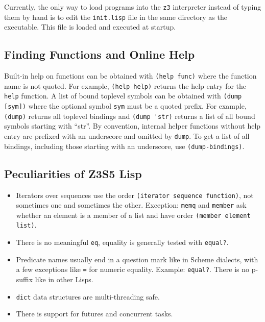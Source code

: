 \documentclass[
]{article}
\newcommand{\passthrough}[1]{#1}
\begin{document}
Currently, the only way to load programs into the
\passthrough{\lstinline!z3!} interpreter instead of typing them by hand
is to edit the \passthrough{\lstinline!init.lisp!} file in the same
directory as the executable. This file is loaded and executed at
startup.

\hypertarget{finding-functions-and-online-help}{%
\subsection{Finding Functions and Online
Help}\label{finding-functions-and-online-help}}

Built-in help on functions can be obtained with
\passthrough{\lstinline!(help func)!} where the function name is not
quoted. For example, \passthrough{\lstinline!(help help)!} returns the
help entry for the \passthrough{\lstinline!help!} function. A list of
bound toplevel symbols can be obtained with
\passthrough{\lstinline!(dump [sym])!} where the optional symbol
\passthrough{\lstinline!sym!} must be a quoted prefix. For example,
\passthrough{\lstinline!(dump)!} returns all toplevel bindings and
\passthrough{\lstinline!(dump 'str)!} returns a list of all bound
symbols starting with ``str''. By convention, internal helper functions
without help entry are prefixed with an underscore and omitted by
\passthrough{\lstinline!dump!}. To get a list of all bindings, including
those starting with an underscore, use
\passthrough{\lstinline!(dump-bindings)!}.

\hypertarget{peculiarities-of-z3s5-lisp}{%
\subsection{Peculiarities of Z3S5
Lisp}\label{peculiarities-of-z3s5-lisp}}

\begin{itemize}
\item
  Iterators over sequences use the order
  \passthrough{\lstinline!(iterator sequence function)!}, not sometimes
  one and sometimes the other. Exception: \passthrough{\lstinline!memq!}
  and \passthrough{\lstinline!member!} ask whether an element is a
  member of a list and have order
  \passthrough{\lstinline!(member element list)!}.
\item
  There is no meaningful \passthrough{\lstinline!eq!}, equality is
  generally tested with \passthrough{\lstinline!equal?!}.
\item
  Predicate names usually end in a question mark like in Scheme
  dialects, with a few exceptions like \passthrough{\lstinline!=!} for
  numeric equality. Example: \passthrough{\lstinline!equal?!}. There is
  no p-suffix like in other Lisps.
\item
  \passthrough{\lstinline!dict!} data structures are multi-threading
  safe.
\item
  There is support for futures and concurrent tasks.
\end{itemize}
\end{document}
